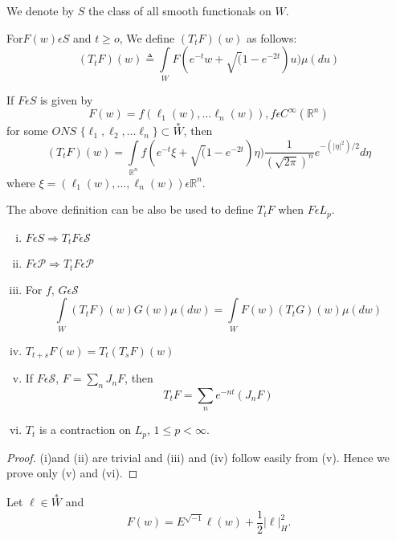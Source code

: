 We denote by $S$ the class of all smooth functionals on $W$. 

\begin{definition}%
  For\pageoriginale $F(w) \epsilon  S$ and $t \ge o$, We define
  $(T_tF)(w)$ as follows: 
  \begin{equation*}
    (T_tF)(w) \triangleq \int\limits_{W} F(e^{-t}w+ \surd(1-e^{-2t})
    u)\mu(du) \tag{1.2}\label{eq1.2} 
  \end{equation*}
\end{definition}

\medskip
{}
If $F \epsilon  S$ is given by 
$$
F(w)=f(\ell_1(w), \ldots  \ell_n(w)), f \epsilon  C^\infty(\mathbb{R}^n)
$$
for some $ONS$  $\{\ell_1, \ell_2, \ldots \ell_n\} \subset
\overset{\ast}{W}$, then  
\begin{equation*}
  (T_tF)(w) = \int\limits_{\mathbb{R}^n} f(e^{-t } \xi + \surd
  (1-e^{-2t}) \eta) \frac{1}{(\sqrt{2 \pi})^n}e^{-(|\eta|^2) /2}d \eta
  \tag{1.3}\label{eq1.3}  
\end{equation*}
 where $ \xi = (\ell_1(w), \ldots, \ell_n (w)) \epsilon
 \mathbb{R}^n$.

\medskip
{}
The above definition can be also be used to define $T_tF$ when $F
\epsilon  L_p$. 

\medskip
{}
\begin{enumerate}[(i)]
\item $F \epsilon   S \Rightarrow T_tF \epsilon  \mathcal{S}$
\item $F \epsilon  \mathcal{P} \Rightarrow T_t F \epsilon  \mathcal{P}$
\item For $f$, $G \epsilon  \mathcal{S}$ 
  $$
  \int\limits_{W}(T_tF)(w)G(w) \mu(dw)= \int\limits_{W} F(w) (T_tG)(w) \mu (dw)
  $$
\item $T_{t+s}F(w)=T_t(T_s F)(w)$
\item If $F \epsilon  \mathcal{S}$, $F= \sum\limits_{n} J_nF$, then 
  $$
  T_t F= \sum_{n}e^{-nt}(J_nF)
  $$
\item $T_t$ is a contraction on $L_p$, $1 \le p < \infty$.
\end{enumerate}

\begin{proof}
(i)\pageoriginale and (ii) are trivial and (iii) and (iv) follow easily from
  (v). Hence we prove only (v) and (vi). 
\end{proof}

\medskip
{}
   Let $\ell \in \overset{\ast}{W}$ and 
  $$
  F(w) = E^{\sqrt{-1}} \ell (w) +\frac{1}{2} |\ell|^2_H. 
  $$

